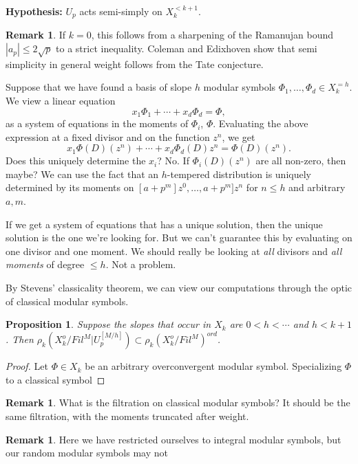 \documentclass[12pt]{article}
\newtheorem{prop}[thm]{Proposition}
\theoremstyle{definition}
\newtheorem{rem}[thm]{Remark}
\begin{document}
{\bf Hypothesis:} $U_p$ acts semi-simply on $X_k^{<k+1}$. 
\begin{rem}
If $k=0$, this follows from a sharpening of the Ramanujan bound $|a_p|\leq 2\sqrt{p}$ to a strict inequality. Coleman and Edixhoven show that semi simplicity in general weight follows from the Tate conjecture.
\end{rem}

Suppose that we have found a basis of slope $h$ modular symbols $\Phi_1,\ldots,\Phi_d\in X_k^{=h}$. We view a linear equation
\begin{equation}
	x_1\Phi_1+\cdots+x_d\Phi_d = \Phi,
\end{equation}
as a system of equations in the moments of $\Phi_i$, $\Phi$. Evaluating the above expression at a fixed divisor and on the function $z^n$, we get
\begin{equation}
	x_1\Phi(D)(z^n)+\cdots +x_d\Phi_d(D)z^n=\Phi(D)(z^n).
\end{equation}
Does this uniquely determine the $x_i$? No. If $\Phi_i(D)(z^n)$ are all non-zero, then maybe? We can use the fact that an $h$-tempered distribution is uniquely determined by its moments on $[a+p^m]z^0,\ldots,a+p^m]z^n$ for $n\leq h$ and arbitrary $a, m$.

If we get a system of equations that has a unique solution, then the unique solution is the one we're looking for. But we can't guarantee this by evaluating on one divisor and one moment. We should really be looking at \emph{all} divisors and \emph{all moments} of degree $\leq h$. Not a problem.



By Stevens' classicality theorem, we can view our computations through the optic of classical modular symbols. 
\begin{prop}
Suppose the slopes that occur in $X_k$ are $0< h<\cdots$ and $h<k+1$. Then $\rho_k(X_k^o/Fil^M |U_p^{[M/h]}) \subset \rho_k(X_k^o/Fil^M)^{ord}$.
\end{prop}
\begin{proof}
Let $\Phi\in X_k$ be an arbitrary overconvergent modular symbol. Specializing $\Phi$ to a classical symbol 
\end{proof}

\begin{rem}
What is the filtration on classical modular symbols? It should be the same filtration, with the moments truncated after weight.
\end{rem}
\begin{rem}
Here we have restricted ourselves to integral modular symbols, but our random modular symbols may not
\end{rem}
\end{document}
